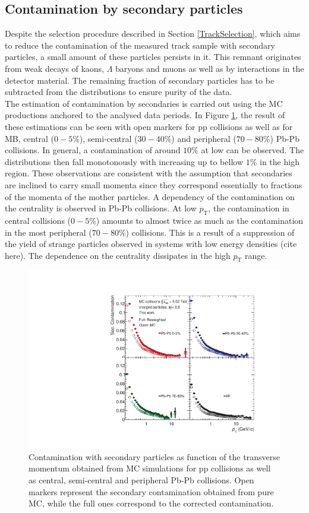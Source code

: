 \documentclass[12pt,a4paper]{report}
\begin{document}
\subsection{Contamination by secondary particles}
Despite the selection procedure described in Section \ref{TrackSelection}, which aims to reduce the contamination of the measured track sample with secondary particles, a small amount of these particles persists in it. This remnant originates from weak decays of kaons, $\Lambda$ baryons and muons as well as by interactions in the detector material. The remaining fraction of secondary particles has to be subtracted from the \pt distributions to ensure purity of the data.\\
The estimation of contamination by secondaries is carried out using the MC productions anchored to the analysed data periods. In Figure \ref{SecCont}, the result of these estimations can be seen with open markers for pp collisions as well as for MB, central ($0-5$\%), semi-central ($30-40$\%) and peripheral ($70-80$\%) Pb-Pb collisions. In general, a contamination of around  $10\%$ at low \pt can be observed. The distributions then fall monotonously with increasing \pt up to bellow $1\%$ in the high \pt region. These observations are consistent with the assumption that secondaries are inclined to carry small momenta since they correspond essentially to fractions of the momenta of the mother particles. A dependency of the contamination on the centrality is observed in Pb-Pb collisions. At low $p_\text{T}$, the contamination in central collisions ($0-5$\%) amounts to almost twice as much as the contamination in the most peripheral ($70-80$\%) collisions. This is a result of a suppression of the yield of strange particles observed in systems with low energy densities (cite here). The dependence on the centrality dissipates in the high $p_\text{T}$ range.
\begin{figure}[tb!]
\centering
\includegraphics[width=12cm]{Plots/secCont.pdf}  
\caption{Contamination with secondary particles as function of the transverse momentum obtained from MC simulations for pp collisions as well as central, semi-central and peripheral Pb-Pb collisions. Open markers represent the secondary contamination obtained from pure MC, while the full ones correspond to the  corrected contamination.}
\label{SecCont}
\end{figure}
\end{document}
